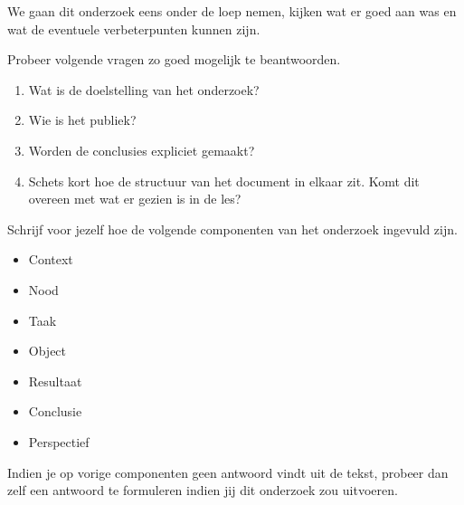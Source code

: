 We gaan dit onderzoek eens onder de loep nemen, kijken wat er goed aan was en wat de eventuele verbeterpunten kunnen zijn. 

\begin{exercise}
  Probeer volgende vragen zo goed mogelijk te beantwoorden.
  \begin{enumerate}
    \item Wat is de doelstelling van het onderzoek?
    \item Wie is het publiek?
    \item Worden de conclusies expliciet gemaakt? 
    \item Schets kort hoe de structuur van het document in elkaar zit. Komt dit overeen met wat er gezien is in de les?
  \end{enumerate}
\end{exercise}

\begin{exercise}
  Schrijf voor jezelf hoe de volgende componenten van het onderzoek ingevuld zijn.
  \begin{itemize}
    \item Context
    \item Nood
    \item Taak
    \item Object
    \item Resultaat
    \item Conclusie
    \item Perspectief
  \end{itemize}
  
  Indien je op vorige componenten geen antwoord vindt uit de tekst, probeer dan zelf een antwoord te formuleren indien jij dit onderzoek zou uitvoeren. 
\end{exercise}
